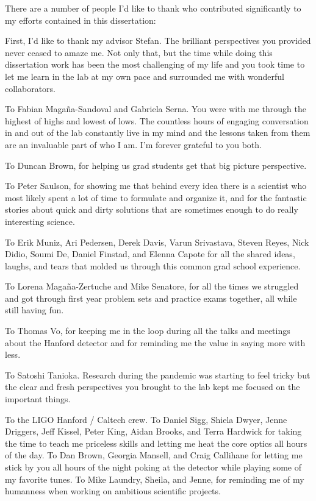 \documentclass[12pt]{report}
\begin{document}
\fancyfoot[C]{\makebox[0pt][l]{\makebox[2.5cm][c]{\thepage}}}

\pagestyle{fancy}

\setcounter{page}{4}

There are a number of people I’d like to thank who contributed significantly to my efforts contained in this dissertation:

First, I’d like to thank my advisor Stefan. The brilliant perspectives you provided never ceased to amaze me. Not only that, but the time while doing this dissertation work has been the most challenging of my life and you took time to let me learn in the lab at my own pace and surrounded me with wonderful collaborators. 

To Fabian Maga\~{n}a-Sandoval and Gabriela Serna. You were with me through the highest of highs and lowest of lows. The countless hours of engaging conversation in and out of the lab constantly live in my mind and the lessons taken from them are an invaluable part of who I am. I’m forever grateful to you both. 

To Duncan Brown, for helping us grad students get that big picture perspective.

To Peter Saulson, for showing me that behind every idea there is a scientist who most likely spent a lot of time to formulate and organize it, and for the fantastic stories about quick and dirty solutions that are sometimes enough to do really interesting science.

To Erik Muniz, Ari Pedersen, Derek Davis, Varun Srivastava, Steven Reyes, Nick Didio, Soumi De, Daniel Finstad, and Elenna Capote for all the shared ideas, laughs, and tears that molded us through this common grad school experience. 

To Lorena Magaña-Zertuche and Mike Senatore, for all the times we struggled and got through first year problem sets and practice exams together, all while still having fun. 

To Thomas Vo, for keeping me in the loop during all the talks and meetings about the Hanford detector and for reminding me the value in saying more with less. 

To Satoshi Tanioka. Research during the pandemic was starting to feel tricky but the clear and fresh perspectives you brought to the lab kept me focused on the important things.

To the LIGO Hanford / Caltech crew. To Daniel Sigg, Shiela Dwyer, Jenne Driggers, Jeff Kissel, Peter King, Aidan Brooks, and Terra Hardwick for taking the time to teach me priceless skills and letting me heat the core optics all hours of the day. To Dan Brown, Georgia Mansell, and Craig Callihane for letting me stick by you all hours of the night poking at the detector while playing some of my favorite tunes. To Mike Laundry, Sheila, and Jenne, for reminding me of my humanness when working on ambitious scientific projects.
\end{document}
